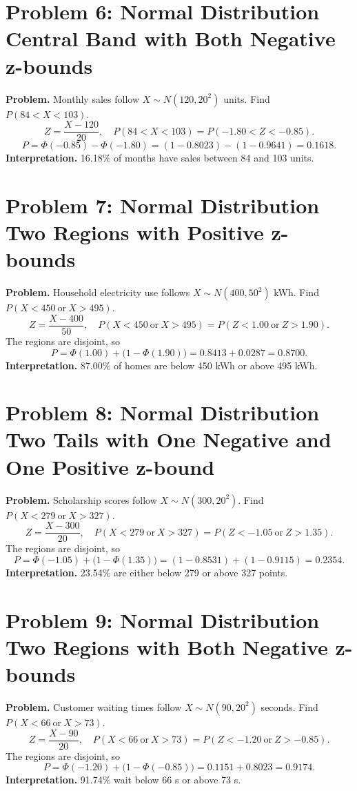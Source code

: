 \section{Problem 6: Normal Distribution Central Band with Both Negative z-bounds}
\textbf{Problem.} Monthly sales follow \(X\sim N(120,20^2)\) units. Find \(P(84<X<103)\).\\
\[Z=\frac{X-120}{20},\quad P(84<X<103)=P(-1.80<Z<-0.85).\]
\[P=\Phi(-0.85)-\Phi(-1.80)=(1-0.8023)-(1-0.9641)=0.1618.\]
\textbf{Interpretation.} 16.18\% of months have sales between 84 and 103 units.

\section{Problem 7: Normal Distribution Two Regions with Positive z-bounds}
\textbf{Problem.} Household electricity use follows \(X\sim N(400,50^2)\) kWh. Find \(P(X<450\ \text{or}\ X>495)\).\\
\[Z=\frac{X-400}{50},\quad P(X<450\ \text{or}\ X>495)=P(Z<1.00\ \text{or}\ Z>1.90).\]
The regions are disjoint, so
\[P=\Phi(1.00)+\bigl(1-\Phi(1.90)\bigr)=0.8413+0.0287=0.8700.\]
\textbf{Interpretation.} 87.00\% of homes are below 450 kWh or above 495 kWh.

\section{Problem 8: Normal Distribution Two Tails with One Negative and One Positive z-bound}
\textbf{Problem.} Scholarship scores follow \(X\sim N(300,20^2)\). Find \(P(X<279\ \text{or}\ X>327)\).\\
\[Z=\frac{X-300}{20},\quad P(X<279\ \text{or}\ X>327)=P(Z<-1.05\ \text{or}\ Z>1.35).\]
The regions are disjoint, so
\[P=\Phi(-1.05)+\bigl(1-\Phi(1.35)\bigr)=(1-0.8531)+(1-0.9115)=0.2354.\]
\textbf{Interpretation.} 23.54\% are either below 279 or above 327 points.

\section{Problem 9: Normal Distribution Two Regions with Both Negative z-bounds}
\textbf{Problem.} Customer waiting times follow \(X\sim N(90,20^2)\) seconds. Find \(P(X<66\ \text{or}\ X>73)\).\\
\[Z=\frac{X-90}{20},\quad P(X<66\ \text{or}\ X>73)=P(Z<-1.20\ \text{or}\ Z>-0.85).\]
The regions are disjoint, so
\[P=\Phi(-1.20)+\bigl(1-\Phi(-0.85)\bigr)=0.1151+0.8023=0.9174.\]
\textbf{Interpretation.} 91.74\% wait below 66 s or above 73 s.


